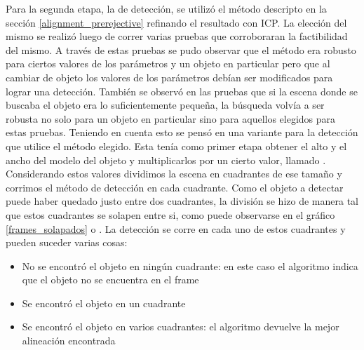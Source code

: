 Para la segunda etapa, la de detección, se utilizó el método descripto en la sección \ref{alignment_prerejective} refinando el resultado con ICP. La elección del mismo se realizó luego de correr varias pruebas que corroboraran la factibilidad del mismo. A través de estas pruebas se pudo observar que el método era robusto para ciertos valores de los parámetros y un objeto en particular pero que al cambiar de objeto los valores de los parámetros debían ser modificados para lograr una detección. También se observó en las pruebas que si la escena donde se buscaba el objeto era lo suficientemente pequeña, la búsqueda volvía a ser robusta no solo para un objeto en particular sino para aquellos elegidos para estas pruebas. Teniendo en cuenta esto se pensó en una variante para la detección que utilice el método elegido. Esta tenía como primer etapa obtener el alto y el ancho del modelo del objeto y multiplicarlos por un cierto valor, llamado . Considerando estos valores dividimos la escena en cuadrantes de ese tamaño y corrimos el método de detección en cada cuadrante. Como el objeto a detectar puede haber quedado justo entre dos cuadrantes, la división se hizo de manera tal que estos cuadrantes se solapen entre si, como puede observarse en el gráfico \ref{frames_solapados}  o . La detección se corre en cada uno de estos cuadrantes y pueden suceder varias cosas:
\begin{itemize}
	\item No se encontró el objeto en ningún cuadrante: en este caso el algoritmo indica que el objeto no se encuentra en el frame
	\item Se encontró el objeto en un cuadrante
	\item Se encontró el objeto en varios cuadrantes: el algoritmo devuelve la mejor alineación encontrada
\end{itemize}

